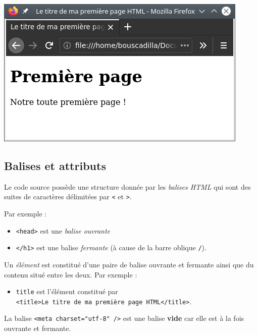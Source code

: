 \documentclass[a4paper,12pt]{article}
\makeatletter
\let\origfigure\figure
\let\endorigfigure\endfigure
\renewenvironment{figure}[1][2] {
    \expandafter\origfigure\expandafter[H]
} {
    \endorigfigure
}
\def\maxwidth{\ifdim\Gin@nat@width>\linewidth\linewidth
    \else\Gin@nat@width\fi}
\let\Oldincludegraphics\includegraphics
\renewcommand{\includegraphics}[1]{\Oldincludegraphics[width=.8\maxwidth]{#1}}
\providecommand{\tightlist}{%
      \setlength{\itemsep}{0pt}\setlength{\parskip}{0pt}}
\makeatother
\begin{document}
\begin{methode}
\begin{figure}
\centering
\includegraphics{res/premier_exemple.png}
\caption{Capture d'écran du premier exemple}
\end{figure}

        \end{methode}
    \hypertarget{balises-et-attributs}{%
\subsection{Balises et attributs}\label{balises-et-attributs}}

    Le code source possède une structure donnée par les \emph{balises HTML}
qui sont des suites de caractères délimitées par \texttt{\textless{}} et
\texttt{\textgreater{}}.

Par exemple :

\begin{itemize}
\tightlist
\item
  \texttt{\textless{}head\textgreater{}} est une \emph{balise ouvrante}
\item
  \texttt{\textless{}/h1\textgreater{}} est une balise \emph{fermante}
  (à cause de la barre oblique \texttt{/}).
\end{itemize}

Un \emph{élément} est constitué d'une paire de balise ouvrante et
fermante ainsi que du contenu situé entre les deux. Par exemple :

\begin{itemize}
\tightlist
\item
  \texttt{title} est l'élément constitué par
  \texttt{\textless{}title\textgreater{}Le\ titre\ de\ ma\ première\ page\ HTML\textless{}/title\textgreater{}}.
\end{itemize}

La balise \texttt{\textless{}meta\ charset="utf-8"\ /\textgreater{}} est
une balise \textbf{vide} car elle est à la fois ouvrante et fermante.
\end{document}
